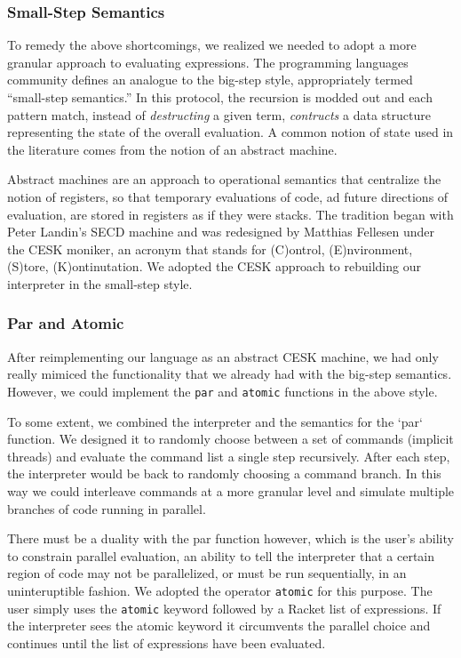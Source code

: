 \subsubsection{Small-Step Semantics}
To remedy the above shortcomings, we realized we needed to adopt a more granular approach to evaluating expressions.  The programming languages community defines an analogue to the big-step style, appropriately termed ``small-step semantics.''  In this protocol, the recursion is modded out and each pattern match, instead of \emph{destructing} a given term, \emph{contructs} a data structure representing the state of the overall evaluation.  A common notion of state used in the literature comes from the notion of an abstract machine.

Abstract machines are an approach to operational semantics that centralize the notion of registers, so that temporary evaluations of code, ad future directions of evaluation, are stored in registers as if they were stacks.   The tradition began with Peter Landin's SECD machine and was redesigned by Matthias Fellesen under the CESK moniker, an acronym that stands for (C)ontrol, (E)nvironment, (S)tore, (K)ontinutation.  We adopted the CESK approach to rebuilding our interpreter in the small-step  style.

\subsubsection{Par and Atomic}
After reimplementing our language as an abstract CESK machine, we had only really mimiced the functionality that we already had with the big-step semantics.  However, we could implement the \texttt{par} and \texttt{atomic} functions in the above style.

To some extent, we combined the interpreter and the semantics for the `par` function.  We designed it to randomly choose between a set of commands (implicit threads) and evaluate the command list a single step recursively.  After each step, the interpreter would be back to randomly choosing a command branch.  In this way we could interleave commands at a more granular level and simulate multiple branches of code running in parallel.

There must be a duality with the par function however, which is the user's ability to constrain parallel evaluation, an ability to tell the interpreter that a certain region of code may not be parallelized, or must be run sequentially, in an uninteruptible fashion.  We adopted the operator \texttt{atomic} for this purpose.  The user simply uses the \texttt{atomic} keyword followed by a Racket list of expressions.  If the interpreter sees the atomic keyword it circumvents the parallel choice and continues until the list of expressions have been evaluated.

